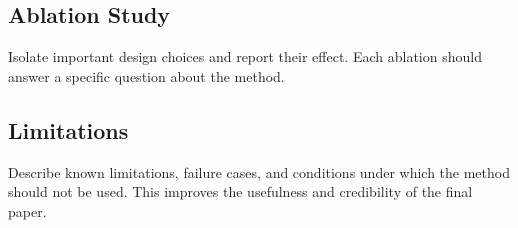 \subsection{Ablation Study}

Isolate important design choices and report their effect.
Each ablation should answer a specific question about the method.

\subsection{Limitations}

Describe known limitations, failure cases, and conditions under which the method should not be used.
This improves the usefulness and credibility of the final paper.
